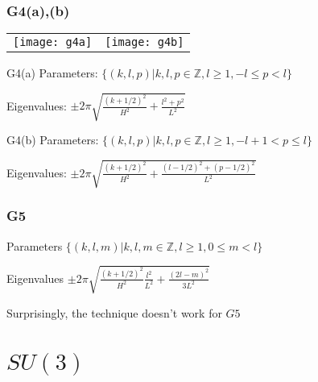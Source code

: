 \documentclass{beamer}
\def\Z{{\mathbb Z}}
\begin{document}
\begin{frame}
	\frametitle{G4(a),(b)}
		\begin{tabular}[]{lr}
\texttt{[image: g4a]} & \texttt{[image: g4b]}\\
		\end{tabular}
		\begin{block}{G4(a)}
			Parameters: $\{(k,l,p)| k,l,p \in \Z, l \geq 1, -l \leq p < l\}$

			Eigenvalues: $\pm 2\pi\sqrt{\frac{(k+1/2)^2}{H^2} + \frac{l^2 + p^2}{L^2}}$
		\end{block}
		\begin{block}{G4(b)}
			Parameters: $\{(k,l,p)| k,l,p \in \Z, l \geq 1, -l + 1 < p \leq l\}$

			Eigenvalues: $\pm 2\pi\sqrt{\frac{(k+1/2)^2}{H^2} + \frac{(l-1/2)^2 + (p - 1/2)^2}{L^2}}$
		\end{block}
\end{frame}

\begin{frame}
	\frametitle{G5}
	\begin{block}{Parameters}
		$\{(k,l,m)| k,l,m \in \Z, l \geq 1, 0 \leq m < l\}$
	\end{block}

	\begin{block}{Eigenvalues}
		$\pm 2\pi\sqrt{\frac{(k+1/2)^2}{H^2}\frac{l^2}{L^2} + \frac{(2l- m)^2}{3L^2}}$
	\end{block}

	\pause

	\begin{block}{}
		Surprisingly, the technique doesn't work for $G5$
	\end{block}
\end{frame}

\section{$SU(3)$}
\end{document}
